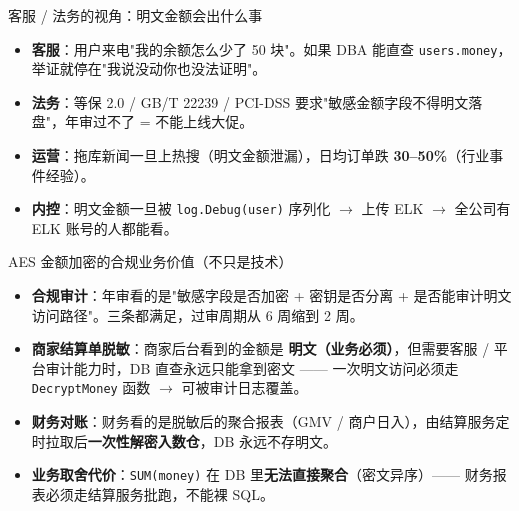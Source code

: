 \documentclass[aspectratio=169,11pt]{beamer}
\begin{document}
\begin{frame}[shrink]{客服 / 法务的视角：明文金额会出什么事}
\begin{itemize}
  \item \textbf{客服}：用户来电"我的余额怎么少了 50 块"。如果 DBA 能直查 \texttt{users.money}，举证就停在"我说没动你也没法证明"。
  \item \textbf{法务}：等保 2.0 / GB/T 22239 / PCI-DSS 要求"敏感金额字段不得明文落盘"，年审过不了 = 不能上线大促。
  \item \textbf{运营}：拖库新闻一旦上热搜（明文金额泄漏），日均订单跌 \textbf{30--50\%}（行业事件经验）。
  \item \textbf{内控}：明文金额一旦被 \texttt{log.Debug(user)} 序列化 $\to$ 上传 ELK $\to$ 全公司有 ELK 账号的人都能看。
\end{itemize}
\end{frame}

\begin{frame}[shrink]{AES 金额加密的合规业务价值（不只是技术）}
\begin{itemize}
  \item \textbf{合规审计}：年审看的是"敏感字段是否加密 + 密钥是否分离 + 是否能审计明文访问路径"。三条都满足，过审周期从 6 周缩到 2 周。
  \item \textbf{商家结算单脱敏}：商家后台看到的金额是 \textbf{明文（业务必须）}，但需要客服 / 平台审计能力时，DB 直查永远只能拿到密文 —— 一次明文访问必须走 \texttt{DecryptMoney} 函数 $\to$ 可被审计日志覆盖。
  \item \textbf{财务对账}：财务看的是脱敏后的聚合报表（GMV / 商户日入），由结算服务定时拉取后\textbf{一次性解密入数仓}，DB 永远不存明文。
  \item \textbf{业务取舍代价}：\texttt{SUM(money)} 在 DB 里\textbf{无法直接聚合}（密文异序）—— 财务报表必须走结算服务批跑，不能裸 SQL。
\end{itemize}
\end{frame}
\end{document}
